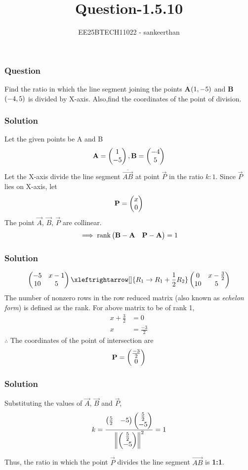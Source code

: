 \documentclass{beamer}
\title{Question-1.5.10}
\author{EE25BTECH11022 - sankeerthan}
\date{}
\begin{document}
\frame{\titlepage}

\begin{frame}
\frametitle{Question}
Find the ratio in which the line segment joining the points \textbf{A}$\left(1,-5\right)$ and \textbf{B}$\left(-4,5\right)$ is divided by X-axis. Also,find the coordinates of the  point of division.
\end{frame}

\begin{frame}
\frametitle{Solution}
Let the given points be A and B
\begin{align*} \mathbf{A} = \begin{pmatrix}1 \\ -5\end{pmatrix}, \mathbf{B} = \begin{pmatrix}-4 \\ 5\end{pmatrix} \end{align*}
Let the X-axis divide the line segment \(\overline{\vec{AB}}\) at point $\vec{P}$ in the ratio $k:1$.
Since $\vec{P}$ lies on X-axis, let
\begin{align*}
\mathbf{P} = \begin{pmatrix}x \\ 0\end{pmatrix}
\end{align*}
The point $\vec{A}$, $\vec{B}$, $\vec{P}$ are collinear.
\begin{align}
\implies \text{rank}\begin{pmatrix}\mathbf{B}-\mathbf{A} & \mathbf{P}-\mathbf{A}\end{pmatrix} = 1
\end{align}
\end{frame}

\begin{frame}
\frametitle{Solution}
\begin{align}
\myvec{-5 & x-1 \\ 10 & 5} \xleftrightarrow[]{R_1 \rightarrow {R_1 + \frac{1}{2}R_2}}\myvec{0 & x-\frac{3}{2} \\ 10 & 5}  
\end{align}
The number of nonzero rows in the row reduced matrix (also known as {\em echelon form}) is defined as the rank. For above matrix to be of rank 1,
\begin{align}
x+\frac{3}{2} &= 0 \\
x &= \frac{-3}{2}
\end{align}
$\therefore$ The coordinates of the point of intersection are 
\begin{align*}
\mathbf{P} = \begin{pmatrix}\frac{-3}{2} \\ 0\end{pmatrix}
\end{align*}
\end{frame}

\begin{frame}
\frametitle{Solution}
Substituting the values of $\vec{A}$, $\vec{B}$ and $\vec{P}$,
\begin{align}
k=\frac{\begin{pmatrix}\frac{5}{2} & -5\end{pmatrix}\begin{pmatrix}\frac{5}{2} \\ -5\end{pmatrix}}{\left\lVert\begin{pmatrix}\frac{5}{2} \\ -5\end{pmatrix}\right\rVert^2}=1
\end{align}

Thus, the ratio in which the point $\vec{P}$ divides the line segment $\vec{AB}$ is \textbf{1:1}. 
\end{frame}
\end{document}
